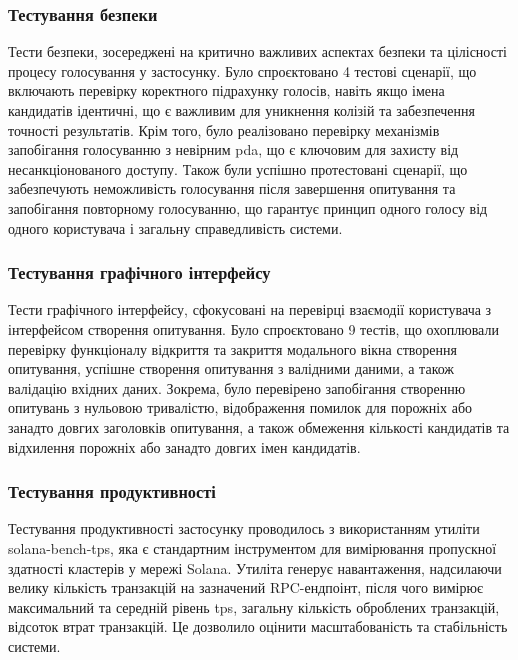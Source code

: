 \documentclass[14pt]{extreport}
\begin{document}
  \subsubsection{Тестування безпеки}
  
  Тести безпеки, зосереджені на критично важливих аспектах безпеки та цілісності процесу голосування у застосунку. Було спроєктовано 4 тестові сценарії, що включають перевірку коректного підрахунку голосів, навіть якщо імена кандидатів ідентичні, що є важливим для уникнення колізій та забезпечення точності результатів. Крім того, було реалізовано перевірку механізмів запобігання голосуванню з невірним \gls{pda}, що є ключовим для захисту від несанкціонованого доступу. Також були успішно протестовані сценарії, що забезпечують неможливість голосування після завершення опитування та запобігання повторному голосуванню, що гарантує принцип одного голосу від одного користувача і загальну справедливість системи.
  
  \subsubsection{Тестування графічного інтерфейсу}
  
  Тести графічного інтерфейсу, сфокусовані на перевірці взаємодії користувача з інтерфейсом створення опитування. Було спроєктовано 9 тестів, що охоплювали перевірку функціоналу відкриття та закриття модального вікна створення опитування, успішне створення опитування з валідними даними, а також валідацію вхідних даних. Зокрема, було перевірено запобігання створенню опитувань з нульовою тривалістю, відображення помилок для порожніх або занадто довгих заголовків опитування, а також обмеження кількості кандидатів та відхилення порожніх або занадто довгих імен кандидатів.
  
  \subsubsection{Тестування продуктивності}
  
  Тестування продуктивності застосунку проводилось з використанням утиліти solana-bench-tps, яка є стандартним інструментом для вимірювання пропускної здатності кластерів у мережі Solana. Утиліта генерує навантаження, надсилаючи велику кількість транзакцій на зазначений RPC-ендпоінт, після чого вимірює максимальний та середній рівень \gls{tps}, загальну кількість оброблених транзакцій, відсоток втрат транзакцій. Це дозволило оцінити масштабованість та стабільність системи.
  
\end{document}
